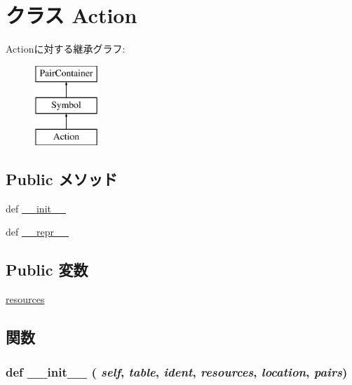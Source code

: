 \hypertarget{classslicc_1_1symbols_1_1Action_1_1Action}{
\section{クラス Action}
\label{classslicc_1_1symbols_1_1Action_1_1Action}
}
Actionに対する継承グラフ:\begin{figure}[H]
\begin{center}
\leavevmode
\includegraphics[height=3cm]{classslicc_1_1symbols_1_1Action_1_1Action}
\end{center}
\end{figure}
\subsection*{Public メソッド}
\begin{DoxyCompactItemize}
\item 
def \hyperlink{classslicc_1_1symbols_1_1Action_1_1Action_ac775ee34451fdfa742b318538164070e}{\_\-\_\-init\_\-\_\-}
\item 
def \hyperlink{classslicc_1_1symbols_1_1Action_1_1Action_ad8b9328939df072e4740cd9a63189744}{\_\-\_\-repr\_\-\_\-}
\end{DoxyCompactItemize}
\subsection*{Public 変数}
\begin{DoxyCompactItemize}
\item 
\hyperlink{classslicc_1_1symbols_1_1Action_1_1Action_a715e7b31400aa585643e94e0ba160aab}{resources}
\end{DoxyCompactItemize}


\subsection{関数}
\hypertarget{classslicc_1_1symbols_1_1Action_1_1Action_ac775ee34451fdfa742b318538164070e}{
\subsubsection[{\_\-\_\-init\_\-\_\-}]{\setlength{\rightskip}{0pt plus 5cm}def \_\-\_\-init\_\-\_\- ( {\em self}, \/   {\em table}, \/   {\em ident}, \/   {\em resources}, \/   {\em location}, \/   {\em pairs})}}
\label{classslicc_1_1symbols_1_1Action_1_1Action_ac775ee34451fdfa742b318538164070e}



